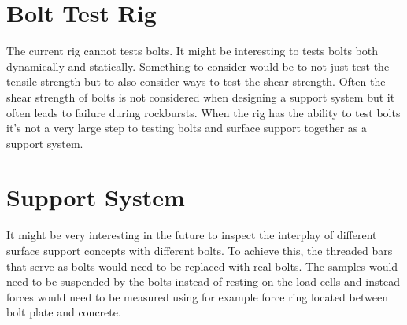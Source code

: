 
\section{Bolt Test Rig}

The current rig cannot tests bolts. It might be interesting to tests bolts both dynamically and statically. Something to consider would be to not just test the tensile strength but to also consider ways to test the shear strength. Often the shear strength of bolts is not considered when designing a support system but it often leads to failure during rockbursts. \autocite[17]{guler01} When the rig has the ability to test bolts it's not a very large step to testing bolts and surface support together as a support system.

\section{Support System}

 It might be very interesting in the future to inspect the interplay of different surface support concepts with different bolts. To achieve this, the threaded bars that serve as bolts would need to be replaced with real bolts. The samples would need to be suspended by the bolts instead of resting on the load cells and instead forces would need to be measured using for example force ring located between bolt plate and concrete.
 





